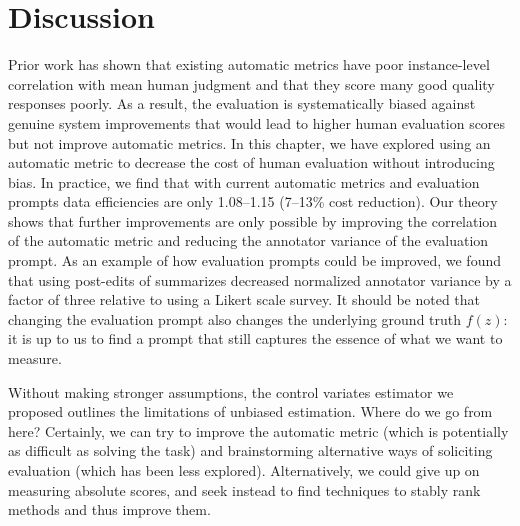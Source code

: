 \section{Discussion}
\label{sec:price:discussion}

Prior work has shown that existing automatic metrics have poor instance-level correlation with mean human judgment and that they score many good quality responses poorly.
As a result, the evaluation is systematically biased against genuine system improvements that would lead to higher human evaluation scores but not improve automatic metrics.
In this chapter, we have explored using an automatic metric to decrease the cost of human evaluation without introducing bias.
In practice, we find that with current automatic metrics and evaluation prompts data efficiencies are only 1.08--1.15 (7--13\% cost reduction).
Our theory shows that further improvements are only possible by improving the correlation of the automatic metric and reducing the annotator variance of the evaluation prompt.
As an example of how evaluation prompts could be improved, we found that using post-edits of summarizes decreased normalized annotator variance by a factor of three relative to using a Likert scale survey.
It should be noted that changing the evaluation prompt also changes the underlying ground truth $f(z)$: it is up to us to find a prompt that still captures the essence of what we want to measure.


Without making stronger assumptions, the control variates estimator we proposed outlines the limitations of unbiased estimation.
Where do we go from here?
Certainly, we can try to improve the automatic metric (which is potentially as difficult as solving the task) and brainstorming alternative ways of soliciting evaluation (which has been less explored).
Alternatively, we could give up on measuring absolute scores, and seek instead to find techniques to stably rank methods and thus improve them.

